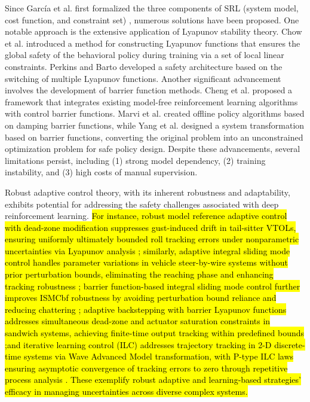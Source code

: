 \documentclass[preprint,12pt]{elsarticle}
\begin{document}
Since García et al. first formalized the three components of SRL (system model, cost function, and constraint set) \cite{10.5555/2789272.2886795}, numerous solutions have been proposed. One notable approach is the extensive application of Lyapunov stability theory. Chow et al. \cite{10.5555/3327757.3327904,Chow2019LyapunovbasedSP} introduced a method for constructing Lyapunov functions that ensures the global safety of the behavioral policy during training via a set of local linear constraints. Perkins and Barto \cite{10.5555/944919.944955} developed a safety architecture based on the switching of multiple Lyapunov functions. Another significant advancement involves the development of barrier function methods. Cheng et al. \cite{DBLP:journals/corr/abs-1903-08792} proposed a framework that integrates existing model-free reinforcement learning algorithms with control barrier functions. Marvi et al. \cite{https://doi.org/10.1002/rnc.5132} created offline policy algorithms based on damping barrier functions, while Yang et al. \cite{8989956} designed a system transformation based on barrier functions, converting the original problem into an unconstrained optimization problem for safe policy design. Despite these advancements, several limitations persist, including (1) strong model dependency, (2) training instability, and (3) high costs of manual supervision.

Robust adaptive control theory, with its inherent robustness and adaptability, exhibits potential for addressing the safety challenges associated with deep reinforcement learning. \hl{For instance, robust model reference adaptive control with dead-zone modification suppresses gust-induced drift in tail-sitter VTOLs, ensuring uniformly ultimately bounded roll tracking errors under nonparametric uncertainties via Lyapunov analysis \cite{act10070162}; similarly, adaptive integral sliding mode control handles parameter variations in vehicle steer-by-wire systems without prior perturbation bounds, eliminating the reaching phase and enhancing tracking robustness \cite{SAEarticle}; barrier function-based integral sliding mode control further improves ISMCbf robustness by avoiding perturbation bound reliance and reducing chattering \cite{wevj15010017}; adaptive backstepping with barrier Lyapunov functions addresses simultaneous dead-zone and actuator saturation constraints in sandwich systems, achieving finite-time output tracking within predefined bounds \cite{Azhdari01112024};and iterative learning control (ILC) addresses trajectory tracking in 2-D discrete-time systems via Wave Advanced Model transformation, with P-type ILC laws ensuring asymptotic convergence of tracking errors to zero through repetitive process analysis \cite{10667811}. These exemplify robust adaptive and learning-based strategies' efficacy in managing uncertainties across diverse complex systems.}
\end{document}
